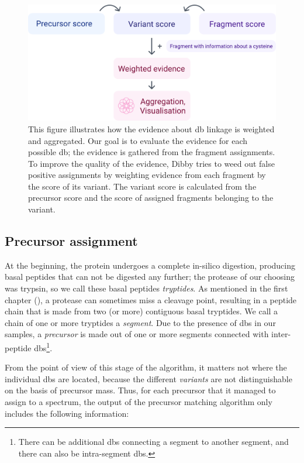 \begin{figure}
  \centering
  \includegraphics[width=0.75\linewidth]{img/score-calculation.pdf}
  \caption{This figure illustrates how the evidence about \gls*{db} linkage is weighted and aggregated. Our goal is to evaluate the evidence for each possible \gls*{db}; the evidence is gathered from the fragment assignments. To improve the quality of the evidence, Dibby tries to weed out false positive assignments by weighting evidence from each fragment by the score of its variant. The variant score is calculated from the precursor score and the score of assigned fragments belonging to the variant.}\label{fig:score-calculation}
\end{figure}


\subsection{Precursor assignment}

At the beginning, the protein undergoes a complete in-silico digestion, producing basal peptides that can not be digested any further; the protease of our choosing was trypsin, so we call these basal peptides \emph{tryptides}. As mentioned in the first chapter (), a protease can sometimes miss a cleavage point, resulting in a peptide chain that is made from two (or more) contiguous basal tryptides. We call a chain of one or more tryptides a \emph{segment}. Due to the presence of \glspl*{db} in our samples, a \emph{precursor} is made out of one or more segments connected with inter-peptide \glspl*{db}\footnote{There can be additional \glspl*{db} connecting a segment to another segment, and there can also be intra-segment \glspl*{db}.}.


From the point of view of this stage of the algorithm, it matters not where the individual \glspl*{db} are located, because the different \emph{variants} are not distinguishable on the basis of precursor mass. Thus, for each precursor that it managed to assign to a spectrum, the output of the precursor matching algorithm only includes the following information:

